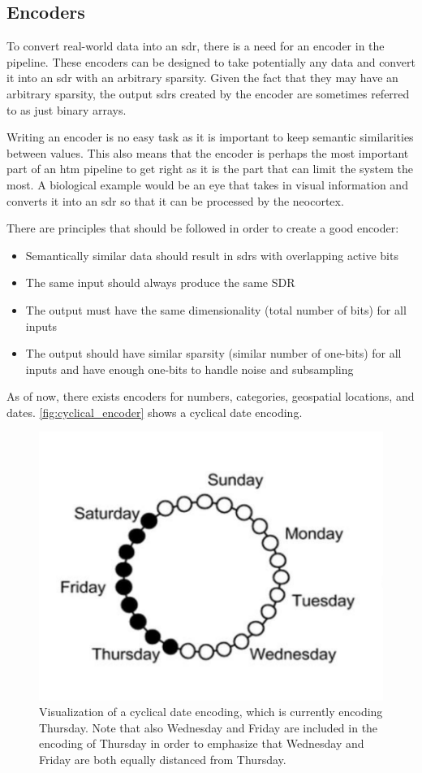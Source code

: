 \subsection{Encoders}
\label{sec:encoders}
To convert real-world data into an \gls*{sdr}, there is a need for an encoder in the pipeline. These encoders can be designed to take potentially any data and convert it into an \gls*{sdr} with an arbitrary sparsity. Given the fact that they may have an arbitrary sparsity, the output \glspl*{sdr} created by the encoder are sometimes referred to as just binary arrays.\par
Writing an encoder is no easy task as it is important to keep semantic similarities between values. This also means that the encoder is perhaps the most important part of an \gls*{htm} pipeline to get right as it is the part that can limit the system the most. A biological example would be an eye that takes in visual information and converts it into an \gls*{sdr} so that it can be processed by the neocortex.
\par
There are principles that should be followed in order to create a good encoder:
\begin{itemize}
    \item Semantically similar data should result in \glspl*{sdr} with overlapping active bits
    \item The same input should always produce the same SDR
    \item The output must have the same dimensionality (total number of bits) for all inputs
    \item The output should have similar sparsity (similar number of one-bits) for all inputs and have enough one-bits to handle noise and subsampling
\end{itemize}
As of now, there exists encoders for numbers, categories, geospatial locations, and dates. \autoref{fig:cyclical_encoder} shows a cyclical date encoding.
\begin{figure}[htb]
    \centering
    \includegraphics[width=0.7\linewidth]{resources/related_works/cyclical_encoder}
    \caption[Cyclical Date Encoding]{Visualization of a cyclical date encoding, which is currently encoding Thursday. Note that also Wednesday and Friday are included in the encoding of Thursday in order to emphasize that Wednesday and Friday are both equally distanced from Thursday.}
    \label{fig:cyclical_encoder}
\end{figure}
